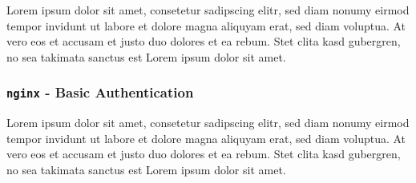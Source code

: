 Lorem ipsum dolor sit amet, consetetur sadipscing elitr, sed diam nonumy eirmod
tempor invidunt ut labore et dolore magna aliquyam erat, sed diam voluptua. At
vero eos et accusam et justo duo dolores et ea rebum. Stet clita kasd gubergren,
no sea takimata sanctus est Lorem ipsum dolor sit amet.

\subsubsection{\texttt{nginx} - Basic Authentication}

Lorem ipsum dolor sit amet, consetetur sadipscing elitr, sed diam nonumy eirmod
tempor invidunt ut labore et dolore magna aliquyam erat, sed diam voluptua. At
vero eos et accusam et justo duo dolores et ea rebum. Stet clita kasd gubergren,
no sea takimata sanctus est Lorem ipsum dolor sit amet.

